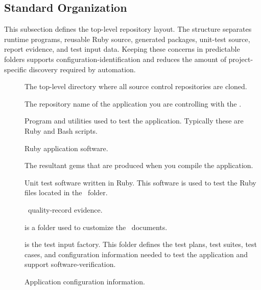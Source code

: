 \clearpage
\subsection{Standard Organization}


\tlcVspace%

This subsection defines the top-level repository layout. The structure separates
runtime programs, reusable Ruby source, generated packages, unit-test source,
\gls{report} evidence, and test input data. Keeping these concerns in
predictable folders supports \gls{configuration-identification} and reduces the
amount of project-specific discovery required by automation.

\tlcVspace%

\begin{description}
  \item[\pfRoot] The top-level directory where all source control repositories
    are cloned.

  \item[\pfRepo] The repository name of the application you are controlling with
    the \af.

  \item[\pfBin] Program and utilities used to test the application. Typically
    these are Ruby and Bash scripts.

  \item[\pfLib] Ruby application software.

  \item[\pfPkg] The resultant gems that are produced when you compile the
    application.

  \item[\pfSpec] Unit test software written in Ruby. This software is used to
    test the Ruby files located in the \pfLib\ folder.

  \item[\pfReport] \docControl\ \gls{quality-record} evidence.

  \item[\pfData] is a folder used to customize the \docControl\ documents.

  \item[\tfFactory] is the test input factory. This folder defines the test
    plans, test suites, test cases, and configuration information needed to
    test the application and support \gls{software-verification}.

  \item[\tfConfig] Application \gls{configuration} information.


\end{description}
